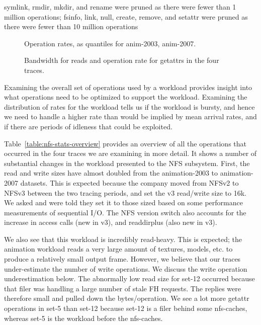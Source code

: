 \begin{table*}
\caption{symlink, rmdir, mkdir, and rename were pruned as there were
fewer than 1 million operations; fsinfo, link, null, create, remove,
and setattr were pruned as there were fewer than 10 million
operations}

\label{table:nfs-stats-overview}
\end{table*}

\begin{figure*}
\caption{Operation rates, as quantiles for anim-2003, anim-2007.}
\label{fig:oprates}
\end{figure*}

\begin{figure*}
\caption{Bandwidth for reads and operation rate for getattrs in the four traces.}
\label{fig:bw-ops-quantiles}
\end{figure*}

Examining the overall set of operations used by a workload provides
insight into what operations need to be optimized to support the
workload.  Examining the distribution of rates for the workload tells
us if the workload is bursty, and hence we need to handle a higher
rate than would be implied by mean arrival rates, and if there are
periods of idleness that could be exploited.

Table~\ref{table:nfs-stats-overview} provides an overview of all the
operations that occurred in the four traces we are examining in more
detail.  It shows a number of substantial changes in the workload
presented to the NFS subsystem.  First, the read and write sizes have
almost doubled from the animation-2003 to animation-2007 datasets.  This is expected
because the company moved from NFSv2 to NFSv3 between the two
tracing periods, and set the v3 read/write size to 16k.  We asked and
were told they set it to those sized based on some performance
measurements of sequential I/O.  The NFS version switch also accounts
for the increase in access calls (new in v3), and readdirplus (also
new in v3).  

We also see that this workload is incredibly read-heavy.  This is
expected; the animation workload reads a very large amount of
textures, models, etc. to produce a relatively small output frame.
However, we believe that our traces under-estimate the number of write
operations.  We discuss the write operation underestimation below.
The abnormally low read size for set-12 occurred because
that filer was handling a large number of stale FH requests.  The
replies were therefore small and pulled down the bytes/operation.  We
see a lot more getattr operations in set-5 than set-12 because set-12
is a filer behind some nfs-caches, whereas set-5 is the workload
before the nfs-caches.

